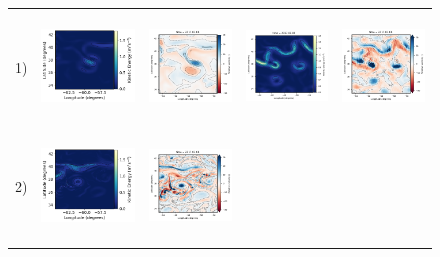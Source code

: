 \begin{bibunit}
\begin{figure}[H]
\begin{center}
\begin{tabular}{ccccc}
\hspace{-10mm}  1)&
\includegraphics[trim={0 16mm 26mm 5mm},clip, width=3.3cm,height=2.9cm]{00_Simulearning/figures/plots2/orca025_train_ke.png} &
 \includegraphics[trim={13mm 13mm 22mm 6mm},clip, width=2.9cm,height=2.9cm]{00_Simulearning/figures/plots/orca025_train_vort_r.png} &
 \includegraphics[trim={13mm 13mm 22mm 6mm},clip, width=2.9cm,height=2.9cm]{00_Simulearning/figures/plots/orca025_rec_ke.png} &
 \includegraphics[trim={13mm 13mm 22mm 6mm},clip,width=2.9cm,height=2.9cm]{00_Simulearning/figures/plots/orca025_rec_vort_r.png} \\
\hspace{-10mm} 2) &
 \includegraphics[trim={0 16mm 26mm 5mm},clip, width=3.3cm,height=2.9cm]{00_Simulearning/figures/plots2/glorys12-f_train_ke.png} &
 \includegraphics[trim={13mm 13mm 22mm 6mm},clip, width=2.9cm,height=2.9cm]{00_Simulearning/figures/plots/glorys12-f_train_vort_r.png} &

\end{tabular}
\end{center}
\end{figure}
\end{bibunit}
